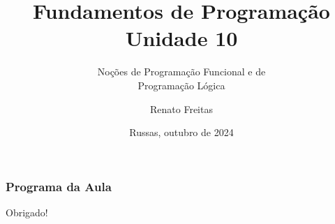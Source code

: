 \documentclass[11pt]{beamer}
\begin{document}
	\title{Fundamentos de Programação \\ Unidade 10}
	\subtitle{Noções de Programação Funcional e de \\Programação Lógica}
	\author{Renato Freitas}
	\date{Russas, outubro de 2024}
	\begin{frame}[plain]
		\maketitle
	\end{frame}
	
	
	\begin{frame}
		\frametitle{Programa da Aula}
		\tableofcontents
	\end{frame}


	
	
	
	


	\begin{frame}[plain]
		\maketitle
		\centering
		Obrigado!
	\end{frame}
\end{document}
